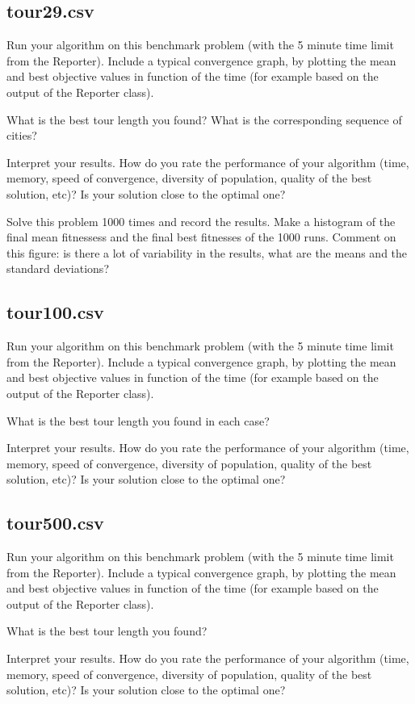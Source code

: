 \documentclass[a4paper,10pt]{article}
\newcommand{\ReplaceMe}[1]{{\color{blue}#1}}
\begin{document}
\subsection{tour29.csv}

\ReplaceMe{Run your algorithm on this benchmark problem (with the 5 minute time limit from the Reporter). Include a typical convergence graph, by plotting the mean and best objective values in function of the time (for example based on the output of the Reporter class). 

What is the best tour length you found? What is the corresponding sequence of cities? 

Interpret your results. How do you rate the performance of your algorithm (time, memory, speed of convergence, diversity of population, quality of the best solution, etc)? Is your solution close to the optimal one?

Solve this problem 1000 times and record the results. Make a histogram of the final mean fitnessess and the final best fitnesses of the 1000 runs. Comment on this figure: is there a lot of variability in the results, what are the means and the standard deviations?}

\subsection{tour100.csv}

\ReplaceMe{Run your algorithm on this benchmark problem (with the 5 minute time limit from the Reporter). Include a typical convergence graph, by plotting the mean and best objective values in function of the time (for example based on the output of the Reporter class). 

What is the best tour length you found in each case? 

Interpret your results. How do you rate the performance of your algorithm (time, memory, speed of convergence, diversity of population, quality of the best solution, etc)? Is your solution close to the optimal one?}

\subsection{tour500.csv}

\ReplaceMe{Run your algorithm on this benchmark problem (with the 5 minute time limit from the Reporter). Include a typical convergence graph, by plotting the mean and best objective values in function of the time (for example based on the output of the Reporter class). 

What is the best tour length you found? 

Interpret your results. How do you rate the performance of your algorithm (time, memory, speed of convergence, diversity of population, quality of the best solution, etc)? Is your solution close to the optimal one?}
\end{document}
